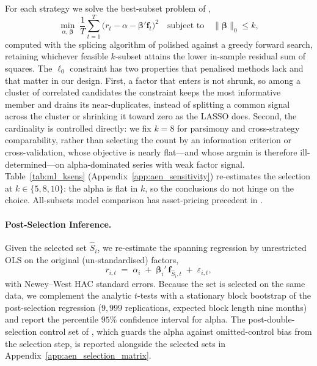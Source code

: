 For each strategy we solve the best-subset problem of
\citet{bertsimas2016best},
\begin{equation}\label{eq:best_subset}
\min_{\alpha,\,\boldsymbol{\beta}}\;
\frac{1}{T}\sum_{t=1}^{T}\bigl(r_t - \alpha -
\boldsymbol{\beta}'\mathbf{f}_t\bigr)^2
\quad \text{subject to} \quad
\|\boldsymbol{\beta}\|_0 \le k,
\end{equation}
computed with the splicing algorithm of \citet{zhu2020polynomial}
polished against a greedy forward search, retaining whichever feasible
$k$-subset attains the lower in-sample residual sum of squares. The $\ell_0$ constraint has two properties
that penalised methods lack and that matter in our design. First, a
factor that enters is not shrunk, so among a cluster of correlated
candidates the constraint keeps the most informative member and drains
its near-duplicates, instead of splitting a common signal across the
cluster or shrinking it toward zero as the LASSO does. Second, the
cardinality is controlled directly: we fix $k = 8$ for parsimony and
cross-strategy comparability, rather than selecting the count by an
information criterion or cross-validation, whose objective is nearly
flat---and whose argmin is therefore ill-determined---on
alpha-dominated series with weak factor signal.
Table~\ref{tab:ml_ksens} (Appendix~\ref{app:aen_sensitivity})
re-estimates the selection at $k \in \{5, 8, 10\}$: the alpha is flat in
$k$, so the conclusions do not hinge on the choice. All-subsets model comparison has
asset-pricing precedent in \citet{barillas2018comparing}.

\paragraph{Post-Selection Inference.}

Given the selected set $\hat{S}_i$, we re-estimate the spanning
regression by unrestricted OLS on the original (un-standardised)
factors,
\begin{equation}\label{eq:post_ols}
r_{i,t} \;=\; \alpha_i \;+\; \boldsymbol{\beta}_i'\,
\mathbf{f}_{\hat{S}_i,t} \;+\; \varepsilon_{i,t},
\end{equation}
with Newey--West HAC standard errors. Because the set is selected
on the same data, we complement the analytic $t$-tests with a
stationary block bootstrap \citep{politis1994stationary} of the
post-selection regression ($9{,}999$ replications, expected block
length nine months) and report the percentile $95\%$ confidence
interval for alpha. The post-double-selection control set of
\citet{belloni2014inference}, which guards the alpha against
omitted-control bias from the selection step, is reported alongside
the selected sets in Appendix~\ref{app:aen_selection_matrix}.

